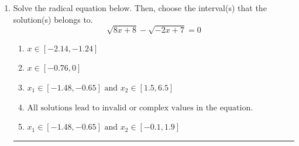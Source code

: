 \documentclass[14pt]{extbook}
\newcommand{\litem}[1]{\item#1\hspace*{-1cm}\rule{\textwidth}{0.4pt}}
\begin{document}
\begin{enumerate}
{\begin{enumerate}[label=\Alph*.]
\end{enumerate} }
\litem{
Solve the radical equation below. Then, choose the interval(s) that the solution(s) belongs to.\[ \sqrt{8 x + 8} - \sqrt{-2 x + 7} = 0 \]\begin{enumerate}[label=\Alph*.]
\item \( x \in [-2.14,-1.24] \)
\item \( x \in [-0.76,0] \)
\item \( x_1 \in [-1.48, -0.65] \text{ and } x_2 \in [1.5,6.5] \)
\item \( \text{All solutions lead to invalid or complex values in the equation.} \)
\item \( x_1 \in [-1.48, -0.65] \text{ and } x_2 \in [-0.1,1.9] \)

\end{enumerate} }
\end{enumerate}
\end{document}
